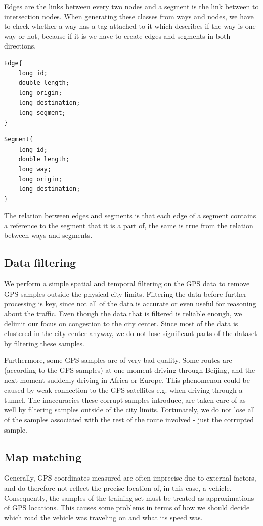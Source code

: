 Edges are the links between every two nodes and a segment is the link between to intersection nodes. When generating these classes from ways and nodes, we have to check whether a way has a tag attached to it which describes if the way is one-way or not, because if it is we have to create edges and segments in both directions.

\begin{lstlisting}[style=java, caption=Datastructure for an edge]
Edge{
	long id;
	double length;
	long origin;
	long destination;
	long segment;
}
\end{lstlisting}

\begin{lstlisting}[style=java, caption=Datastructure for a segment]
Segment{
	long id;
	double length;
	long way;
	long origin;
	long destination;
}
\end{lstlisting}

The relation between edges and segments is that each edge of a segment contains a reference to the segment that it is a part of, the same is true from the relation between ways and segments.

\subsection{Data filtering}\label{sec:datafiltering}
We perform a simple spatial and temporal filtering on the GPS data to remove GPS samples outside the physical city limits. Filtering the data before further processing is key, since not all of the data is accurate or even useful for reasoning about the traffic. Even though the data that is filtered is reliable enough, we delimit our focus on congestion to the city center. Since most of the data is clustered in the city center anyway, we do not lose significant parts of the dataset by filtering these samples.

Furthermore, some GPS samples are of very bad quality. Some routes are (according to the GPS samples) at one moment driving through Beijing, and the next moment suddenly driving in Africa or Europe. This phenomenon could be caused by weak connection to the GPS satellites e.g. when driving through a tunnel. The inaccuracies these corrupt samples introduce, are taken care of as well by filtering samples outside of the city limits. Fortunately, we do not lose all of the samples associated with the rest of the route involved - just the corrupted sample.

\subsection{Map matching}\label{sec:mapmatching}
Generally, GPS coordinates measured are often imprecise due to external factors, and do therefore not reflect the precise location of, in this case, a vehicle. Consequently, the samples of the training set must be treated as approximations of GPS locations. This causes some problems in terms of how we should decide which road the vehicle was traveling on and what its speed was.

